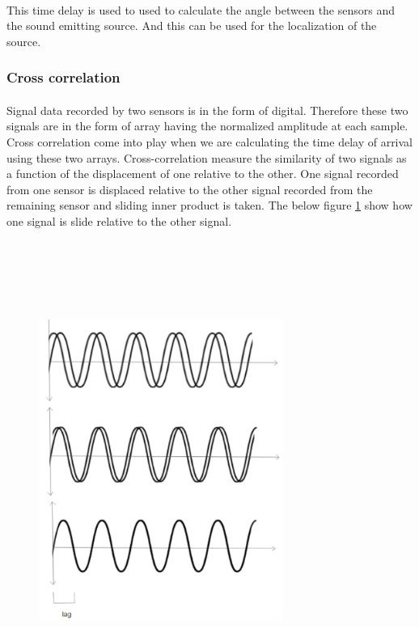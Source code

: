 \documentclass[12pt]{article}
\numberwithin{figure}{section}
\numberwithin{table}{section}
\begin{document}
\paragraph{}
This time delay is used to used to calculate the angle between the sensors and the sound emitting source. And this can be used for the localization of the source. 

\subsubsection{Cross correlation}

\paragraph{}
Signal data recorded by two sensors is in the form of digital. Therefore these two signals are in the form of array having the normalized amplitude at each sample. Cross correlation come into play when we are calculating the time delay of arrival using these two arrays. Cross-correlation measure the similarity of two signals as a function of the displacement of one relative to the other. One signal recorded from one sensor is displaced relative to the other signal recorded from the remaining sensor and sliding inner product is taken. The below figure \ref{crosscor} show how one signal is slide relative to the other signal.

\begin{figure}[H]
\centering
\includegraphics[width=80mm,height=150mm]{crosscor.png}
\caption{}
\label{crosscor}
\end{figure}
\end{document}
